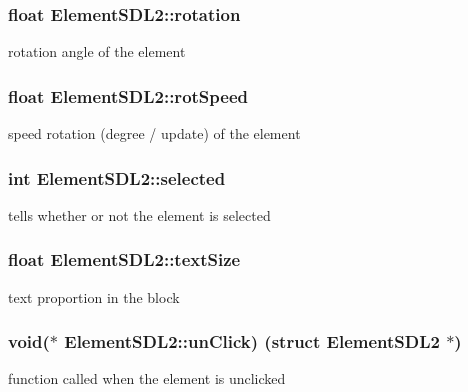 \subsubsection[{\texorpdfstring{rotation}{rotation}}]{\setlength{\rightskip}{0pt plus 5cm}float Element\+S\+D\+L2\+::rotation}\hypertarget{structElementSDL2_a8bbd5c157ceaba03f33b77e71daa7a79}{}\label{structElementSDL2_a8bbd5c157ceaba03f33b77e71daa7a79}
rotation angle of the element 
\subsubsection[{\texorpdfstring{rot\+Speed}{rotSpeed}}]{\setlength{\rightskip}{0pt plus 5cm}float Element\+S\+D\+L2\+::rot\+Speed}\hypertarget{structElementSDL2_a46a53dcb3d0d119e5df7cd276de2c4ae}{}\label{structElementSDL2_a46a53dcb3d0d119e5df7cd276de2c4ae}
speed rotation (degree / update) of the element 
\subsubsection[{\texorpdfstring{selected}{selected}}]{\setlength{\rightskip}{0pt plus 5cm}int Element\+S\+D\+L2\+::selected}\hypertarget{structElementSDL2_a2cae92fe5dd207db485261128b82bc02}{}\label{structElementSDL2_a2cae92fe5dd207db485261128b82bc02}
tells whether or not the element is selected 
\subsubsection[{\texorpdfstring{text\+Size}{textSize}}]{\setlength{\rightskip}{0pt plus 5cm}float Element\+S\+D\+L2\+::text\+Size}\hypertarget{structElementSDL2_a49a55a004e56ad15b5b0f0cb0045c83f}{}\label{structElementSDL2_a49a55a004e56ad15b5b0f0cb0045c83f}
text proportion in the block 
\subsubsection[{\texorpdfstring{un\+Click}{unClick}}]{\setlength{\rightskip}{0pt plus 5cm}void($\ast$ Element\+S\+D\+L2\+::un\+Click) (struct {\bf Element\+S\+D\+L2} $\ast$)}\hypertarget{structElementSDL2_a0ad4094686063db36244b474fe42a336}{}\label{structElementSDL2_a0ad4094686063db36244b474fe42a336}
function called when the element is unclicked 
